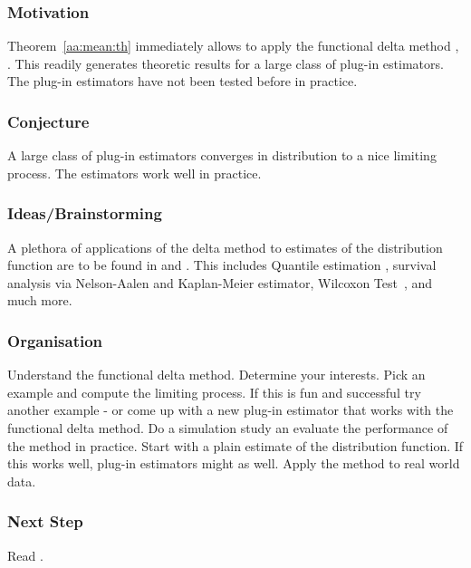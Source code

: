 \subsubsection{Motivation}
Theorem~\ref{aa:mean:th}
immediately allows to apply the functional delta method \cite[§3.9]{vaart2013}, \cite[§20]{Vaart2000}.
This readily generates theoretic results for a large class of plug-in estimators. The plug-in estimators have not been tested before in practice.
\subsubsection{Conjecture}
A large class of plug-in estimators converges in distribution to a nice limiting process.
The estimators work well in practice.
\subsubsection{Ideas/Brainstorming}
A plethora of applications of the delta method to estimates of the distribution function are to be found in \cite{Vaart2000} and \cite{vaart2013}.
This includes Quantile estimation \cite[§21]{Vaart2000}\cite[§3.9.21/24]{vaart2013},
survival analysis via Nelson-Aalen and Kaplan-Meier estimator\cite[§3.9.19/31]{vaart2013},
Wilcoxon Test~\cite[§3.9.4.1]{vaart2013},
and much more.
\subsubsection{Organisation}
Understand the functional delta method.
Determine your interests. Pick an example and compute the limiting process.
If this is fun and successful try another example - or come up with a new plug-in estimator that works with the functional delta method.
Do a simulation study an evaluate the performance of the method in practice.
Start with a plain estimate of the distribution function.
If this works well, plug-in estimators might as well.
Apply the method to real world data.
\subsubsection{Next Step}
Read \cite[§20]{Vaart2000}.
